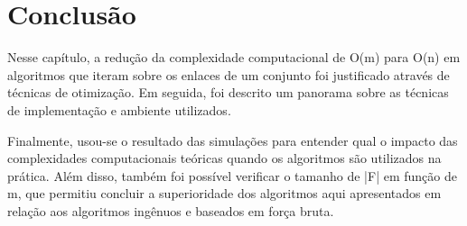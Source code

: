 
\section{Conclusão}

Nesse capítulo, a redução da complexidade computacional de O(m) para O(n) em algoritmos que iteram sobre os enlaces de um conjunto foi justificado através de técnicas de otimização. Em seguida, foi descrito um panorama sobre as técnicas de implementação e ambiente utilizados. 

Finalmente, usou-se o resultado das simulações para entender qual o impacto das complexidades computacionais teóricas quando os algoritmos são utilizados na prática. Além disso, também foi possível verificar o tamanho de |F| em função de m, que permitiu concluir a superioridade dos algoritmos aqui apresentados em relação aos algoritmos ingênuos e baseados em força bruta.
